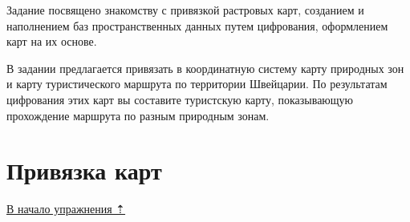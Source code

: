 \documentclass[12pt,]{book}
\begin{document}
Задание посвящено знакомству с привязкой растровых карт, созданием и наполнением баз пространственных данных путем цифрования, оформлением карт на их основе.

В задании предлагается привязать в координатную систему карту природных зон и карту туристического маршрута по территории Швейцарии. По результатам цифрования этих карт вы составите туристскую карту, показывающую прохождение маршрута по разным природным зонам.

\hypertarget{map-ref-general-referencing}{%
\section{Привязка карт}\label{map-ref-general-referencing}}

\protect\hyperlink{map-ref-general}{В начало упражнения ⇡}
\end{document}
